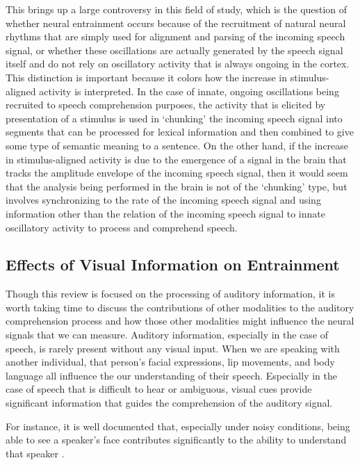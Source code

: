 \documentclass[titlepage]{article}
\begin{document}
    This brings up a large controversy in this field of study, which is the
    question of whether neural entrainment occurs because of the recruitment of
    natural neural rhythms that are simply used for alignment and parsing of the
    incoming speech signal, or whether these oscillations are actually
    generated by the speech signal itself and do not rely on oscillatory
    activity that is always ongoing in the cortex. This distinction is
    important because it colors how the increase in stimulus-aligned activity
    is interpreted. In the case of innate, ongoing oscillations being recruited
    to speech comprehension purposes, the activity that is elicited by
    presentation of a stimulus is used in `chunking' the incoming speech signal
    into segments that can be processed for lexical information and then
    combined to give some type of semantic meaning to a sentence. On the other
    hand, if the increase in stimulus-aligned activity is due to the
    emergence of a signal in the brain that tracks the amplitude envelope of
    the incoming speech signal, then it would seem that the analysis being
    performed in the brain is not of the `chunking' type, but involves
    synchronizing to the rate of the incoming speech signal and using
    information other than the relation of the incoming speech signal to
    innate oscillatory activity to process and comprehend speech.

  \subsection{Effects of Visual Information on Entrainment}

    Though this review is focused on the processing of auditory information, it
    is worth taking time to discuss the contributions of other modalities to
    the auditory comprehension process and how those other modalities might
    influence the neural signals that we can measure. Auditory information,
    especially in the case of speech, is rarely present without any visual
    input. When we are speaking with another individual, that person's facial
    expressions, lip movements, and body language all influence the our
    understanding of their speech. Especially in the case of speech that is
    difficult to hear or ambiguous, visual cues provide significant information
    that guides the comprehension of the auditory signal.

    For instance, it is well documented that, especially under noisy
    conditions, being able to see a speaker's face contributes significantly to
    the ability to understand that speaker \cite{Sumby1954,Erber1969}.
\end{document}
